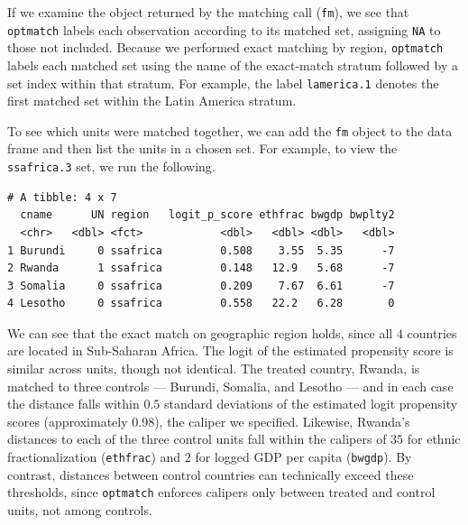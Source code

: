 \documentclass[
  12pt,
  leqno]{article}
\newenvironment{Shaded}{\begin{snugshade}}{\end{snugshade}}
\newcommand{\CommentTok}[1]{\textcolor[rgb]{0.56,0.35,0.01}{\textit{#1}}}
\newcommand{\FunctionTok}[1]{\textcolor[rgb]{0.13,0.29,0.53}{\textbf{#1}}}
\newcommand{\NormalTok}[1]{#1}
\newcommand{\OtherTok}[1]{\textcolor[rgb]{0.56,0.35,0.01}{#1}}
\newcommand{\SpecialCharTok}[1]{\textcolor[rgb]{0.81,0.36,0.00}{\textbf{#1}}}
\newcommand{\StringTok}[1]{\textcolor[rgb]{0.31,0.60,0.02}{#1}}
\begin{document}
If we examine the object returned by the matching call (\texttt{fm}), we
see that \texttt{optmatch} labels each observation according to its
matched set, assigning \texttt{NA} to those not included. Because we
performed exact matching by region, \texttt{optmatch} labels each
matched set using the name of the exact-match stratum followed by a set
index within that stratum. For example, the label \texttt{lamerica.1}
denotes the first matched set within the Latin America stratum.

To see which units were matched together, we can add the \texttt{fm}
object to the data frame and then list the units in a chosen set. For
example, to view the \texttt{ssafrica.3} set, we run the following.

\singlespacing

\begin{Shaded}
\end{Shaded}

\begin{verbatim}
# A tibble: 4 x 7
  cname      UN region   logit_p_score ethfrac bwgdp bwplty2
  <chr>   <dbl> <fct>            <dbl>   <dbl> <dbl>   <dbl>
1 Burundi     0 ssafrica         0.508    3.55  5.35      -7
2 Rwanda      1 ssafrica         0.148   12.9   5.68      -7
3 Somalia     0 ssafrica         0.209    7.67  6.61      -7
4 Lesotho     0 ssafrica         0.558   22.2   6.28       0
\end{verbatim}

\doublespacing

We can see that the exact match on geographic region holds, since all
\(4\) countries are located in Sub-Saharan Africa. The logit of the
estimated propensity score is similar across units, though not
identical. The treated country, Rwanda, is matched to three controls ---
Burundi, Somalia, and Lesotho --- and in each case the distance falls
within \(0.5\) standard deviations of the estimated logit propensity
scores (approximately 0.98), the caliper we specified. Likewise,
Rwanda's distances to each of the three control units fall within the
calipers of \(35\) for ethnic fractionalization (\texttt{ethfrac}) and
\(2\) for logged GDP per capita (\texttt{bwgdp}). By contrast, distances
between control countries can technically exceed these thresholds, since
\texttt{optmatch} enforces calipers only between treated and control
units, not among controls.
\end{document}
